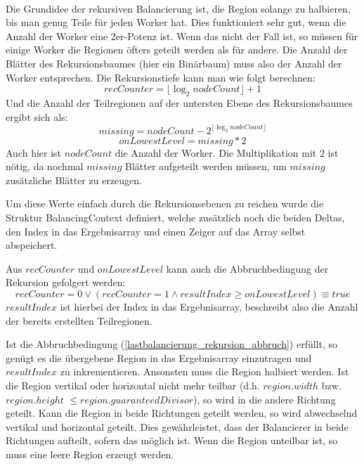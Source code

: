 \paragraph*{} \label{lastbalancierung_naiv_rekursion}
Die Grundidee der rekursiven Balancierung ist, die Region solange zu halbieren, bis man genug Teile für jeden Worker hat.
Dies funktioniert sehr gut, wenn die Anzahl der Worker eine 2er-Potenz ist. Wenn das nicht der Fall ist, so müssen für einige Worker die Regionen öfters geteilt werden als für andere.
Die Anzahl der Blätter des Rekursionsbaumes (hier ein Binärbaum) muss also der Anzahl der Worker entsprechen.
Die Rekursionstiefe kann man wie folgt berechnen:
\begin{equation} \label{lastbalancierung_rekursion_tiefe}
	recCounter = \lfloor\log_2 nodeCount\rfloor + 1
\end{equation}
Und die Anzahl der Teilregionen auf der untersten Ebene des Rekursionsbaumes ergibt sich als:
\begin{equation*}
	missing = nodeCount - 2^{\lfloor\log_2 nodeCount\rfloor}
\end{equation*}
\begin{equation} \label{lastbalancierung_rekursion_ebene}
	onLowestLevel = missing * 2
\end{equation}
Auch hier ist $nodeCount$ die Anzahl der Worker. Die Multiplikation mit 2 ist nötig, da nochmal $missing$ Blätter aufgeteilt werden müssen, um $missing$ zusätzliche Blätter zu erzeugen.

Um diese Werte einfach durch die Rekursionsebenen zu reichen wurde die Struktur BalancingContext definiert, welche zusätzlich noch die beiden Deltas, den Index in das Ergebnisarray und einen Zeiger auf das Array selbst abspeichert.

Aus $recCounter$ und $onLowestLevel$ kann auch die Abbruchbedingung der Rekursion gefolgert werden:
\begin{equation} \label{lastbalancierung_rekursion_abbruch}
	recCounter = 0 \vee (recCounter = 1 \wedge resultIndex \geq onLowestLevel) \equiv true
\end{equation}
$resultIndex$ ist hierbei der Index in das Ergebnisarray, beschreibt also die Anzahl der bereits erstellten Teilregionen.

Ist die Abbruchbedingung (\ref{lastbalancierung_rekursion_abbruch}) erfüllt, so genügt es die übergebene Region in das Ergebnisarray einzutragen und $resultIndex$ zu inkrementieren.
Ansonsten muss die Region halbiert werden. Ist die Region vertikal oder horizontal nicht mehr teilbar (d.h. $region.width$ bzw. $region.height$ $\leq region.guaranteedDivisor$), so wird in die andere Richtung geteilt.
Kann die Region in beide Richtungen geteilt werden, so wird abwechselnd vertikal und horizontal geteilt. Dies gewährleistet, dass der Balancierer in beide Richtungen aufteilt, sofern das möglich ist.
Wenn die Region unteilbar ist, so muss eine leere Region erzeugt werden.


